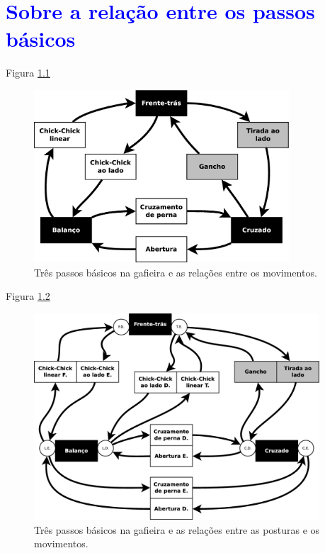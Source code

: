 
\chapter{\textcolor{blue}{Sobre a relação entre os passos básicos}}

Figura \ref{fig:sobre3basicos}

\begin{figure}[h]
  \centering
    \includegraphics[width=0.85\textwidth]{chapters/cap-passos-sobre-basicos/sobrepassos.eps}
  \caption{Três passos básicos na gafieira e as relações entre os movimentos.}
  \label{fig:sobre3basicos}
\end{figure}


Figura \ref{fig:sobre3basicosextendido}

\begin{figure}[h]
  \centering
    \includegraphics[width=0.95\textwidth]{chapters/cap-passos-sobre-basicos/sobrepassos2.eps}
  \caption{Três passos básicos na gafieira e as relações entre as posturas e os movimentos.}
  \label{fig:sobre3basicosextendido}
\end{figure}

